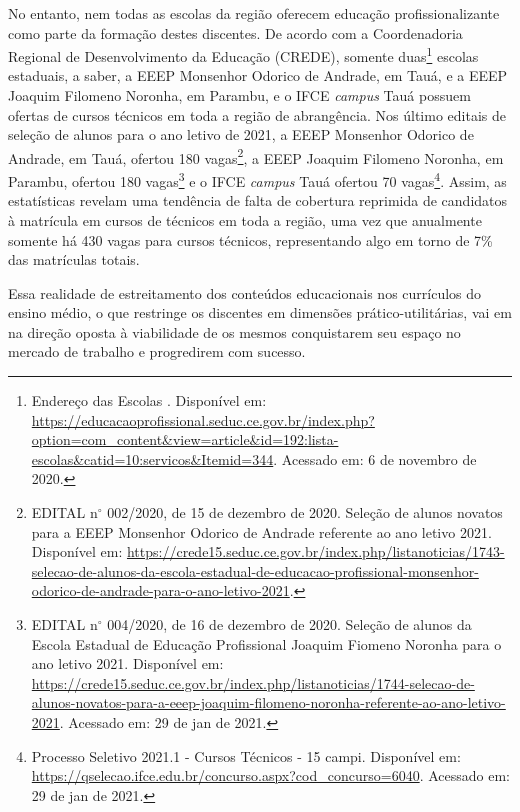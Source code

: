 \documentclass[
	12pt,				%
	openright,			%
	twoside,			%
	a4paper,			%
	chapter=TITLE,		%
	english,			%
	french,				%
	spanish,			%
	brazil,				%
	]{abntex2}
\begin{document}
 No entanto, nem todas as escolas da região oferecem educação profissionalizante
 como parte da formação destes discentes. De acordo com a Coordenadoria Regional
 de Desenvolvimento da Educação (CREDE), somente duas\footnote{Endereço das Escolas
 . Disponível em:
 \url{https://educacaoprofissional.seduc.ce.gov.br/index.php?option=com_content&view=article&id=192:lista-escolas&catid=10:servicos&Itemid=344}.
 Acessado em: 6 de novembro de 2020.} escolas estaduais, a saber, a EEEP Monsenhor Odorico de
 Andrade, em Tauá, e a EEEP Joaquim Filomeno Noronha, em Parambu, e o IFCE 
 \textit{campus} Tauá possuem ofertas de cursos técnicos em toda a região de
 abrangência.  Nos último editais de seleção de alunos para o ano letivo de 2021, a EEEP Monsenhor Odorico de Andrade, em Tauá,
 ofertou 180 vagas\footnote{EDITAL n$^\circ$ 002/2020, de 15 de
 dezembro de 2020. Seleção de alunos novatos para a EEEP Monsenhor Odorico de
 Andrade referente ao ano letivo 2021. Disponível em:
 \href{https://crede15.seduc.ce.gov.br/index.php/listanoticias/1743-selecao-de-alunos-da-escola-estadual-de-educacao-profissional-monsenhor-odorico-de-andrade-para-o-ano-letivo-2021}{https://crede15.seduc.ce.gov.br/index.php/listanoticias/1743-selecao-de-alunos-da-escola-estadual-de-educacao-profissional-monsenhor-odorico-de-andrade-para-o-ano-letivo-2021}.},
 a EEEP Joaquim Filomeno Noronha, em Parambu, ofertou
 180 vagas\footnote{EDITAL n$^\circ$ 004/2020, de 16 de dezembro de
 2020. Seleção de alunos da Escola Estadual de Educação Profissional Joaquim
 Fiomeno Noronha para o ano letivo 2021. Disponível em:
 \href{https://crede15.seduc.ce.gov.br/index.php/listanoticias/1744-selecao-de-alunos-novatos-para-a-eeep-joaquim-filomeno-noronha-referente-ao-ano-letivo-2021}{https://crede15.seduc.ce.gov.br/index.php/listanoticias/1744-selecao-de-alunos-novatos-para-a-eeep-joaquim-filomeno-noronha-referente-ao-ano-letivo-2021}.
 Acessado em: 29 de jan de 2021.} e o IFCE \textit{campus} Tauá ofertou 70 vagas\footnote{Processo Seletivo
 2021.1 - Cursos Técnicos - 15 campi. Disponível em:
 \href{https://qselecao.ifce.edu.br/concurso.aspx?cod_concurso=6040}{https://qselecao.ifce.edu.br/concurso.aspx?cod\_concurso=6040}. Acessado
 em: 29 de jan de 2021.}. Assim, as estatísticas revelam uma tendência de falta de cobertura
 reprimida de candidatos à matrícula em cursos de técnicos em toda a região, uma vez que anualmente somente há 430 vagas para cursos técnicos, representando algo em torno de 7\% das matrículas totais.
 
 Essa realidade de estreitamento dos conteúdos educacionais nos currículos do ensino médio, o que restringe os discentes em dimensões prático-utilitárias, vai em na direção oposta \`a viabilidade de os mesmos conquistarem seu espaço no mercado de trabalho e progredirem com sucesso.
 
\end{document}
